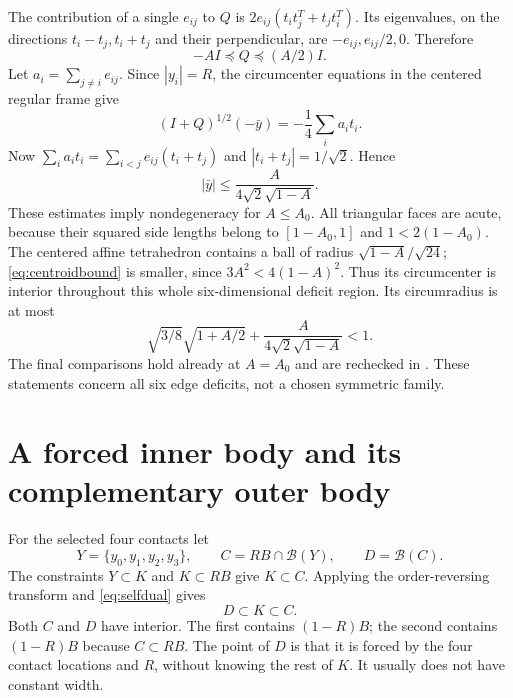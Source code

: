 \documentclass[11pt]{article}
\numberwithin{equation}{section}
\theoremstyle{definition}\newtheorem{definition}[theorem]{Definition}
\theoremstyle{remark}\newtheorem{remark}[theorem]{Remark}
\newcommand{\B}{\mathcal B}
\begin{document}
The contribution of a single $e_{ij}$ to $Q$ is
$2e_{ij}(t_it_j^T+t_jt_i^T)$. Its eigenvalues, on the directions
$t_i-t_j,t_i+t_j$ and their perpendicular, are $-e_{ij},e_{ij}/2,0$.
Therefore
\begin{equation}\label{eq:Qbounds}
 -AI\preceq Q\preceq(A/2)I.
\end{equation}
Let $a_i=\sum_{j\ne i}e_{ij}$. Since $|y_i|=R$, the circumcenter equations
in the centered regular frame give
\[
 (I+Q)^{1/2}(-\bar y)=-\frac14\sum_i a_it_i.
\]
Now $\sum_i a_it_i=\sum_{i<j}e_{ij}(t_i+t_j)$ and
$|t_i+t_j|=1/\sqrt2$. Hence
\begin{equation}\label{eq:centroidbound}
 |\bar y|\le\frac{A}{4\sqrt2\sqrt{1-A}}.
\end{equation}
These estimates imply nondegeneracy for $A\le A_0$. All triangular faces
are acute, because their squared side lengths belong to $[1-A_0,1]$ and
$1<2(1-A_0)$. The centered affine tetrahedron contains a ball of radius
$\sqrt{1-A}/\sqrt{24}$; \cref{eq:centroidbound} is smaller, since
$3A^2<4(1-A)^2$. Thus its circumcenter is interior throughout this whole
six-dimensional deficit region. Its circumradius is at most
\begin{equation}\label{eq:circcontrol}
 \sqrt{3/8}\sqrt{1+A/2}+\frac{A}{4\sqrt2\sqrt{1-A}}<1.
\end{equation}
The final comparisons hold already at $A=A_0$ and are rechecked in
. These statements concern all six
edge deficits, not a chosen symmetric family.

\section{A forced inner body and its complementary outer body}\label{sec:duality}
For the selected four contacts let
\begin{equation}\label{eq:CD}
 Y=\{y_0,y_1,y_2,y_3\},\qquad C=RB\cap\B(Y),\qquad D=\B(C).
\end{equation}
The constraints $Y\subset K$ and $K\subset RB$ give $K\subset C$. Applying
the order-reversing transform and \cref{eq:selfdual} gives
\begin{equation}\label{eq:containment}
 \boxed{D\subset K\subset C.}
\end{equation}
Both $C$ and $D$ have interior. The first contains $(1-R)B$; the second
contains $(1-R)B$ because $C\subset RB$. The point of $D$ is that it is
forced by the four contact locations and $R$, without knowing the rest of
$K$. It usually does not have constant width.
\end{document}
